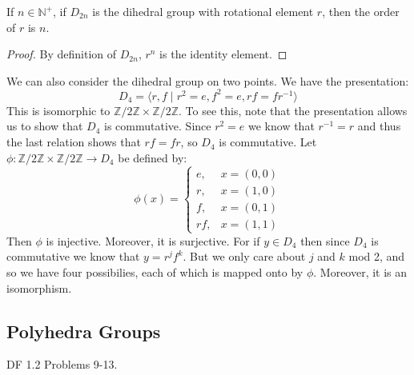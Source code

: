 \documentclass{article}                                                        %
\begin{document}
            \begin{theorem}
                If $n\in\mathbb{N}^{+}$, if $D_{2n}$ is the dihedral group with
                rotational element $r$, then the order of $r$ is $n$.
            \end{theorem}
            \begin{proof}
                By definition of $D_{2n}$, $r^{n}$ is the identity element.
            \end{proof}
            \begin{example}
                We can also consider the dihedral group on two points. We have
                the presentation:
                \begin{equation}
                    D_{4}=\langle{r,f}\;|\;
                        r^{2}=e,f^{2}=e,rf=fr^{\minus{1}}\rangle
                \end{equation}
                This is isomorphic to
                $\mathbb{Z}/2\mathbb{Z}\times\mathbb{Z}/2\mathbb{Z}$. To see
                this, note that the presentation allows us to show that $D_{4}$
                is commutative. Since $r^{2}=e$ we know that $r^{\minus{1}}=r$
                and thus the last relation shows that $rf=fr$, so $D_{4}$ is
                commutative. Let
                $\phi:\mathbb{Z}/2\mathbb{Z}\times\mathbb{Z}/2\mathbb{Z}%
                 \rightarrow{D}_{4}$ be defined by:
                \begin{equation}
                    \phi(x)=
                    \begin{cases}
                        e,&x=(0,0)\\
                        r,&x=(1,0)\\
                        f,&x=(0,1)\\
                        rf,&x=(1,1)
                    \end{cases}
                \end{equation}
                Then $\phi$ is injective. Moreover, it is surjective. For if
                $y\in{D}_{4}$ then since $D_{4}$ is commutative we know that
                $y=r^{j}f^{k}$. But we only care about $j$ and $k$ mod 2, and
                so we have four possibilies, each of which is mapped onto by
                $\phi$. Moreover, it is an isomorphism.
            \end{example}
        \subsection{Polyhedra Groups}
            DF 1.2 Problems 9-13.
\end{document}
